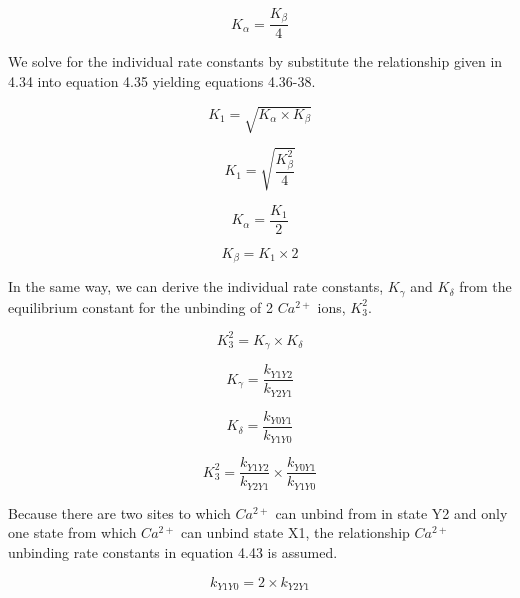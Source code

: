 \documentclass[12pt]{ucsddissertation}
\begin{document}
\begin{equation}
K_{\alpha}= \frac{K_{\beta}}{4}
\end{equation}

We solve for the individual rate constants by substitute the relationship given in 4.34 into equation 4.35 yielding equations 4.36-38. 


\begin{equation}
K_{1}= \sqrt{K_{\alpha} \times K_{\beta}}
\end{equation}


\begin{equation}
K_{1}= \sqrt{ \frac{K_{\beta}^2}{4}}
\end{equation}

\begin{equation}
K_{\alpha}= \frac{K_{1}}{2} 
\end{equation}

\begin{equation}
K_{\beta}= K_{1} \times 2
\end{equation}



In the same way, we can derive the individual rate constants, $K_{\gamma}$ and $K_{\delta}$ from the equilibrium constant for the unbinding of 2 $Ca^{2+}$ ions, $K_{3}^{2}$.  

\begin{equation}
K_{3}^{2}= K_{\gamma} \times K_{\delta}
\end{equation}

\begin{equation}
K_{\gamma} = \frac{k_{Y1Y2}}{k_{Y2Y1}} 
\end{equation}

\begin{equation}
K_{\delta} = \frac{k_{Y0Y1}}{k_{Y1Y0}}
\end{equation}

\begin{equation}
K^{2}_{3}=   \frac{k_{Y1Y2}}{k_{Y2Y1}} \times \frac{k_{Y0Y1}}{k_{Y1Y0}}
\end{equation}

Because there are two sites to which  $Ca^{2+}$ can unbind from in state Y2 and only one state from which $Ca^{2+}$ can unbind state X1, the relationship $Ca^{2+}$ unbinding rate constants in equation 4.43 is assumed. 

\begin{equation}
k_{Y1Y0}=2 \times k_{Y2Y1} 
\end{equation}
\end{document}
